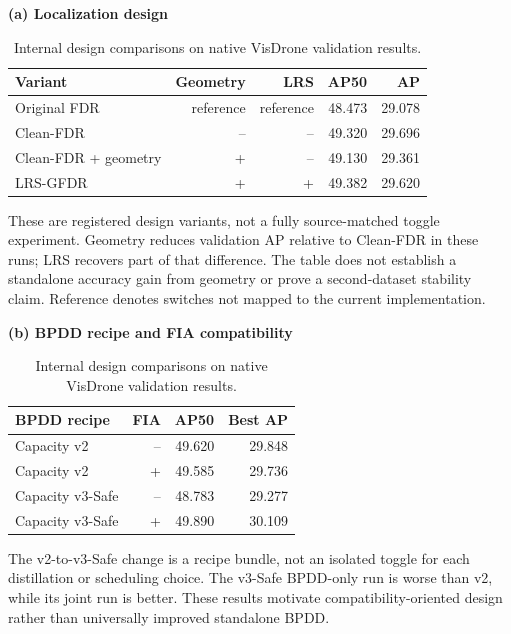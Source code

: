 \begin{table}[t]
\centering
\small
\setlength{\tabcolsep}{4pt}
\caption{Internal design comparisons on native VisDrone validation results.}
\label{tab:selected-3}
\textbf{(a) Localization design}\par\smallskip
\begin{tabular}{lrrrr}
\toprule
Variant & Geometry & LRS & AP50 & AP \\
\midrule
Original FDR & reference & reference & 48.473 & 29.078 \\
Clean-FDR & -- & -- & 49.320 & 29.696 \\
Clean-FDR + geometry & + & -- & 49.130 & 29.361 \\
LRS-GFDR & + & + & 49.382 & 29.620 \\
\bottomrule
\end{tabular}
\par\smallskip
\begin{minipage}{0.97\textwidth}\footnotesize These are registered design variants, not a fully source-matched toggle experiment. Geometry reduces validation AP relative to Clean-FDR in these runs; LRS recovers part of that difference. The table does not establish a standalone accuracy gain from geometry or prove a second-dataset stability claim. Reference denotes switches not mapped to the current implementation.\end{minipage}
\par\medskip
\textbf{(b) BPDD recipe and FIA compatibility}\par\smallskip
\begin{tabular}{lrrr}
\toprule
BPDD recipe & FIA & AP50 & Best AP \\
\midrule
Capacity v2 & -- & 49.620 & 29.848 \\
Capacity v2 & + & 49.585 & 29.736 \\
Capacity v3-Safe & -- & 48.783 & 29.277 \\
Capacity v3-Safe & + & 49.890 & 30.109 \\
\bottomrule
\end{tabular}
\par\smallskip
\begin{minipage}{0.97\textwidth}\footnotesize The v2-to-v3-Safe change is a recipe bundle, not an isolated toggle for each distillation or scheduling choice. The v3-Safe BPDD-only run is worse than v2, while its joint run is better. These results motivate compatibility-oriented design rather than universally improved standalone BPDD.\end{minipage}
\par\medskip
\end{table}
